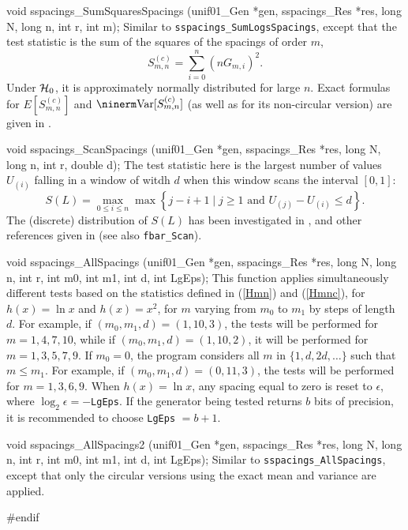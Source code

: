 void sspacings_SumSquaresSpacings (unif01_Gen *gen, sspacings_Res *res,
                                   long N, long n, int r, int m);
\endcode
\tab
  Similar to {\tt sspacings\_SumLogsSpacings}, except that the test
   
  statistic is the sum of the squares of the spacings of order $m$,
 $$
   S_{m,n}^{(c)} = \sum_{i=0}^n (n G_{m,i})^2.
 $$
  Under $\mathcal{H}_0$, it is approximately normally distributed for large $n$.
  Exact formulas for $E[S_{m,n}^{(c)}]$ and $\Var[S_{m,n}^{(c)}]$
  (as well as for its non-circular version) are given in
  \cite{tCRE79a,rLEC97h}.
\endtab
\code


void sspacings_ScanSpacings (unif01_Gen *gen, sspacings_Res *res,
                             long N, long n, int r, double d);
\endcode
\tab
  The test statistic  
  here is the largest number of values $U_{(i)}$
  falling in a window of witdh $d$ when this window scans the
  interval $[0,1]$:
   $$ S(L) = \max_{0\le i\le n} \max \left\{j-i+1
        \mid j\ge 1 \mbox{ and } U_{(j)}-U_{(i)} \le d\right\}.$$
  The (discrete) distribution of $S(L)$ has been investigated in
  \cite{tAND95b,tCRE80a,tWAL74a},
  and other references given in \cite{tSTE86a}
  (see also {\tt fbar\_Scan}).
\endtab
\code


void sspacings_AllSpacings (unif01_Gen *gen, sspacings_Res *res,
                            long N, long n, int r, int m0, int m1, int d,
                            int LgEps);
\endcode
\tab
  This function 
  applies simultaneously different tests based
  on the statistics defined in  (\ref{Hmn}) and (\ref{Hmnc}),
  for $h(x) = \ln x$ and $h(x) = x^2$,
  for $m$ varying from $m_0$ to $m_1$ by steps of length $d$.
  For example, if $(m_0, m_1, d) = (1, 10, 3)$,
  the tests will be performed for $m = 1, 4, 7, 10$, while if
  $(m_0, m_1, d) = (1, 10, 2)$, it will be performed for $m = 1, 3, 5, 7, 9$.
  If $m_0 = 0$, the program considers all $m$ in $\{1, d, 2d, \dots\}$
  such that $m\le m_1$.  For example, if $(m_0, m_1, d) = (0, 11, 3)$,
  the tests will be performed for $m = 1, 3, 6, 9$.
  When $h(x) = \ln x$, any spacing equal to zero is reset to
  $\epsilon$, where  $\log_2 \epsilon = -${\tt LgEps}.
  If the generator being tested returns $b$ bits of precision, it is
  recommended to choose {\tt LgEps} $ = b+1$.
\endtab
\code


void sspacings_AllSpacings2 (unif01_Gen *gen, sspacings_Res *res,
                             long N, long n, int r, int m0, int m1, int d,
                             int LgEps);
\endcode
\tab
  Similar to  {\tt sspacings\_AllSpacings}, except that only the
  circular versions using the exact mean and variance are applied.
\endtab

\code
\hide
#endif
\endhide
\endcode
